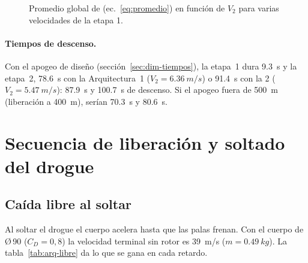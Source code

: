 \begin{figure}[H]
\centering
{}
\caption{Promedio global de  (ec.~\ref{eq:promedio}) en función de $V_2$ para varias
velocidades de la etapa 1.}
\label{fig:arq-prom}
\end{figure}

\paragraph{Tiempos de descenso.} Con el apogeo de diseño (sección~\ref{sec:dim-tiempos}), la
etapa~1 dura \SI{9.3}{s} y la etapa~2, \SI{78.6}{s} con la Arquitectura~1
($V_2=\SI{6.36}{m/s}$) o \SI{91.4}{s} con la 2 ($V_2=\SI{5.47}{m/s}$): \SI{87.9}{s} y
\SI{100.7}{s} de descenso. Si el apogeo fuera de \SI{500}{m} (liberación a \SI{400}{m}),
serían \SI{70.3}{s} y \SI{80.6}{s}.

\section{Secuencia de liberación y soltado del drogue}\label{sec:arq-secuencia}

\subsection{Caída libre al soltar}
Al soltar el drogue el cuerpo acelera hasta que las palas frenan. Con el cuerpo de Ø\,90
($C_D=0{,}8$) la velocidad terminal sin rotor es \SI{39}{m/s} ($m=\SI{0.49}{kg}$). La
tabla~\ref{tab:arq-libre} da lo que se gana en cada retardo.

